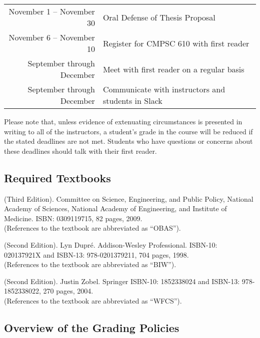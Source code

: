 \documentclass[11pt]{article}
\begin{document}
\begin{center}
\begin{longtable}{r|l}
\hline

November 1 -- November 30 & Oral Defense of Thesis Proposal          \\
November 6 -- November 10 & Register for CMPSC 610 with first reader \\

\hline

September through December & Meet with first reader on a regular basis          \\
September through December & Communicate with instructors and students in Slack \\

\hline

\end{longtable}
\end{center}

\vspace*{-.25in}

\noindent Please note that, unless evidence of extenuating circumstances is
presented in writing to all of the instructors, a student's grade in the course
will be reduced if the stated deadlines are not met. Students who have questions
or concerns about these deadlines should talk with their first reader.

\subsection*{Required Textbooks}

 (Third Edition).  Committee on Science,
Engineering, and Public Policy, National Academy of Sciences, National Academy of Engineering, and Institute of
Medicine. ISBN: 0309119715, 82 pages, 2009.\\ (References to the textbook are abbreviated as ``OBAS'').

 (Second Edition). Lyn Dupr\'e.  Addison-Wesley
Professional.  ISBN-10: 020137921X and ISBN-13: 978-0201379211, 704 pages, 1998.\\ (References to the textbook are
abbreviated as ``BIW'').

 (Second Edition).  Justin Zobel.  Springer ISBN-10: 1852338024 and ISBN-13:
978-1852338022, 270 pages, 2004. \\ (References to the textbook are abbreviated as ``WFCS'').

\subsection*{Overview of the Grading Policies}
\end{document}
